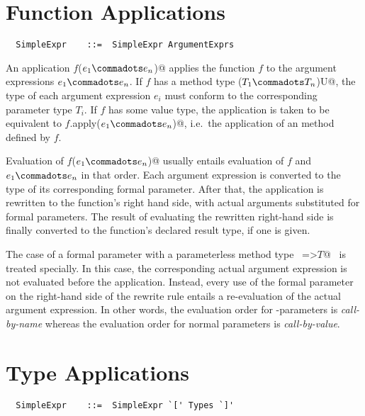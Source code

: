 \section{Function Applications}
\label{sec:apply}

\syntax\begin{lstlisting}
  SimpleExpr    ::=  SimpleExpr ArgumentExprs
\end{lstlisting}

An application \lstinline@$f$($e_1 \commadots e_n$)@ applies the function $f$ to the
argument expressions $e_1 \commadots e_n$. If $f$ has a method type
\lstinline@($T_1 \commadots T_n$)U@, the type of each argument
expression $e_i$ must conform to the corresponding parameter type
$T_i$. If $f$ has some value type, the application is taken to be
equivalent to \lstinline@$f$.apply($e_1 \commadots e_n$)@, i.e.\ the
application of an  method defined by $f$.


Evaluation of \lstinline@$f$($e_1 \commadots e_n$)@ usually entails evaluation of
$f$ and $e_1 \commadots e_n$ in that order. Each argument expression
is converted to the type of its corresponding formal parameter.  After
that, the application is rewritten to the function's right hand side,
with actual arguments substituted for formal parameters.  The result
of evaluating the rewritten right-hand side is finally converted to
the function's declared result type, if one is given.

The case of a formal parameter with a parameterless
method type ~\lstinline@=>$T$@~ is treated specially. In this case, the
corresponding actual argument expression is not evaluated before the
application. Instead, every use of the formal parameter on the
right-hand side of the rewrite rule entails a re-evaluation of the
actual argument expression. In other words, the evaluation order for
\code{=>}-parameters is {\em call-by-name} whereas the evaluation
order for normal parameters is {\em call-by-value}.

\section{Type Applications}
\label{sec:type-app}
\syntax\begin{lstlisting}
  SimpleExpr    ::=  SimpleExpr `[' Types `]'
\end{lstlisting}

